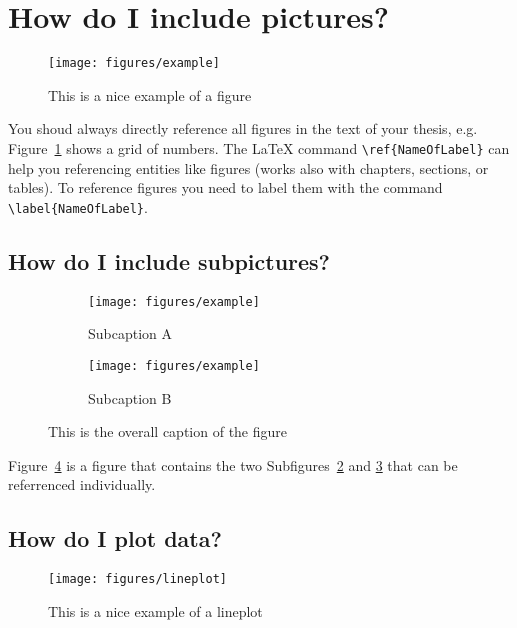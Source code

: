 \section{How do I include pictures?}
\label{sec:pictures}

\begin{figure}
	\centering
	\texttt{[image: figures/example]}
	\caption{This is a nice example of a figure}
	\label{fig:topology}
\end{figure}

You shoud always directly reference all figures in the text of your thesis, e.g. Figure~\ref{fig:topology} shows a grid of numbers.
The \LaTeX{} command \texttt{\textbackslash ref\{NameOfLabel\}} can help you referencing entities like figures (works also with chapters, sections, or tables).
To reference figures you need to label them with the command \texttt{\textbackslash label\{NameOfLabel\}}.

\subsection{How do I include subpictures?}
\label{subsec:subpictures}

\begin{figure}
	\begin{subfigure}[t]{.5\linewidth}
		\centering
		\texttt{[image: figures/example]}
		\caption{Subcaption A}
		\label{sfig:grida}
	\end{subfigure}
	\begin{subfigure}[t]{.5\linewidth}
		\centering
		\texttt{[image: figures/example]}
		\caption{Subcaption B}
		\label{sfig:gridb}
	\end{subfigure}
	\caption{This is the overall caption of the figure}
	\label{fig:topologya}
\end{figure}

Figure~\ref{fig:topologya} is a figure that contains the two Subfigures~\ref{sfig:grida} and \ref{sfig:gridb} that can be referrenced individually.

\pagebreak

\subsection{How do I plot data?}
\label{subsec:plot}

\begin{figure}
	\centering
	\texttt{[image: figures/lineplot]}
	\caption{This is a nice example of a lineplot}
	\label{fig:lineplot}
\end{figure}

